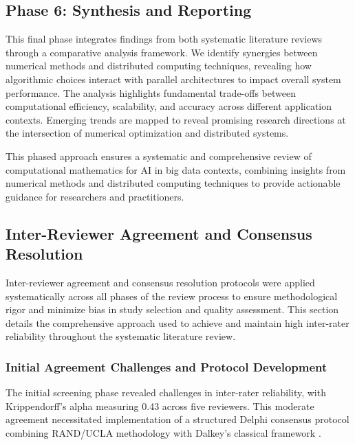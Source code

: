 \documentclass[acmsmall]{acmart}
\begin{document}







\subsection{Phase 6: Synthesis and Reporting}\label{subsec:phase-7-synthesis-and-reporting}

This final phase integrates findings from both systematic literature reviews through a comparative analysis framework. We identify synergies between numerical methods and distributed computing techniques, revealing how algorithmic choices interact with parallel architectures to impact overall system performance. The analysis highlights fundamental trade-offs between computational efficiency, scalability, and accuracy across different application contexts. Emerging trends are mapped to reveal promising research directions at the intersection of numerical optimization and distributed systems.

This phased approach ensures a systematic and comprehensive review of computational mathematics for AI in big data contexts, combining insights from numerical methods and distributed computing techniques to provide actionable guidance for researchers and practitioners.

\subsection{Inter-Reviewer Agreement and Consensus Resolution}\label{subsec:inter-reviewer-agreement-and-consensus-resolution}

Inter-reviewer agreement and consensus resolution protocols were applied systematically across all phases of the review process to ensure methodological rigor and minimize bias in study selection and quality assessment. This section details the comprehensive approach used to achieve and maintain high inter-rater reliability throughout the systematic literature review.

\subsubsection{Initial Agreement Challenges and Protocol Development}\label{subsubsec:inter-reviewer-agreement-initial-challenges}

The initial screening phase revealed challenges in inter-rater reliability, with Krippendorff's alpha measuring 0.43 across five reviewers. This moderate agreement necessitated implementation of a structured Delphi consensus protocol combining RAND/UCLA methodology \citep{fitch2001rand} with Dalkey's classical framework \citep{dalkey1969delphi}.
\end{document}
